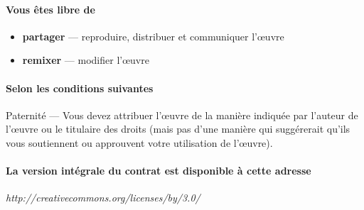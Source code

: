 \documentclass[12pt,a4paper]{book}
\begin{document}
\paragraph*{Vous êtes libre de}

\begin{itemize}
\item \textbf{partager} — reproduire, distribuer et communiquer l'\oe uvre
\item \textbf{remixer} — modifier l'\oe uvre
\end{itemize}

\paragraph*{Selon les conditions suivantes}
Paternité — Vous devez attribuer l'\oe uvre de la manière indiquée par l'auteur de l'\oe uvre ou le titulaire des droits (mais pas d'une manière qui suggérerait qu'ils vous soutiennent ou approuvent votre utilisation de l'\oe uvre). 

\paragraph*{La version intégrale du contrat est disponible à cette adresse}

\begin{center}
\textit{http://creativecommons.org/licenses/by/3.0/}
\end{center}
\end{document}
